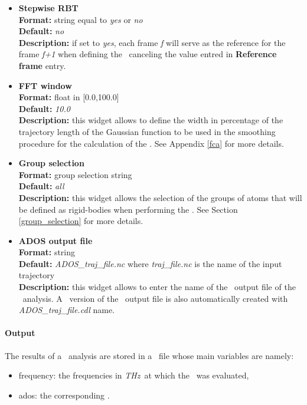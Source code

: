 \documentclass[a4paper,11pt]{report}
\newcommand{\thz}{\textit{THz}}
\begin{document}
\begin{itemize}
\item \textbf{Stepwise RBT}\\
\textbf{Format:} string equal to \textit{yes} or \textit{no}\\
\textbf{Default:} \textit{no}\\
\textbf{Description:} if set to \textit{yes}, each frame \textit{f} will serve as the reference for the frame \textit{f+1} 
when defining the \RBT\ canceling the value entred in \textbf{Reference frame} entry.

\item \textbf{FFT window}\\
\textbf{Format:} float in [0.0,100.0]\\
\textbf{Default:} \textit{10.0}\\
\textbf{Description:} this widget allows to define the width in percentage of the trajectory length of the Gaussian 
function to be used in the smoothing procedure for the calculation of the \ADOS . See Appendix \ref{fca} for more details.

\item \textbf{Group selection}\\
\textbf{Format:} group selection string\\
\textbf{Default:} \textit{all}\\
\textbf{Description:} this widget allows the selection of the groups of atoms that will be defined as rigid-bodies 
when performing the \ADOS . See Section \ref{group_selection} for more details.

\item \textbf{ADOS output file}\\
\textbf{Format:} string\\
\textbf{Default:} \textit{ADOS\_traj\_file.nc} where \textit{traj\_file.nc} is the name of the input trajectory\\
\textbf{Description:} this widget allows to enter the name of the \NetCDF\ output file of the \ADOS\ analysis. A \CDL\ 
version of the \NetCDF\ output file is also automatically created with \textit{ADOS\_traj\_file.cdl} name.
\end{itemize}

\paragraph{Output\\}
The results of a \ADOS\ analysis are stored in a \NetCDF\ file whose main variables are namely:
\begin{itemize}
\item frequency: the frequencies in \thz\ at which the \ADOS\ was evaluated,
\item ados: the corresponding \ADOS .
\end{itemize}
\end{document}
